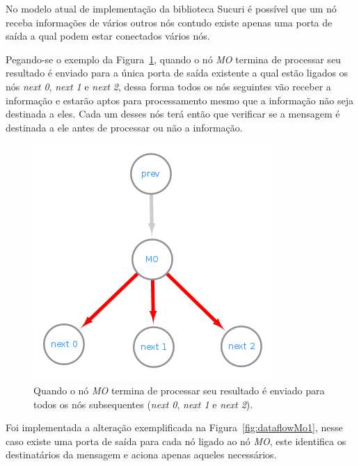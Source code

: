 No modelo atual de implementação da biblioteca Sucuri é possível que um nó receba informações de vários outros nós contudo existe apenas uma porta de saída a qual podem estar conectados vários nós.

Pegando-se o exemplo da Figura~\ref{fig:dataflowMo3}, quando o nó \textit{MO} termina de processar seu resultado é enviado para a única porta de saída existente a qual estão ligados os nós \textit{next 0}, \textit{next 1} e \textit{next 2}, dessa forma todos os nós seguintes vão receber a informação e estarão aptos para processamento mesmo que a informação não seja destinada a eles.
Cada um desses nós terá então que verificar se a mensagem é destinada a ele antes de processar ou não a informação.

\begin{figure}[htbp]
    \centerline{\includegraphics[scale=0.9]{figuras/dataflow/multi_output3.png}}
    \caption{Quando o nó \textit{MO} termina de processar seu resultado é enviado para todos os nós subsequentes (\textit{next 0}, \textit{next 1} e \textit{next 2}).}
    \label{fig:dataflowMo3}
\end{figure}

Foi implementada a alteração exemplificada na Figura~\ref{fig:dataflowMo1}, nesse caso existe uma porta de saída para cada nó ligado ao nó \textit{MO}, este identifica os destinatários da mensagem e aciona apenas aqueles necessários.

